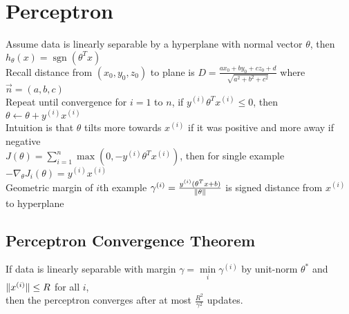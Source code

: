 \documentclass{article}
\DeclareMathOperator{\sgn}{sgn}
\DeclarePairedDelimiter\norm{\lVert}{\rVert}
\begin{document}
\newpage
\section{Perceptron}
Assume data is linearly separable by a hyperplane with normal vector $\theta$, then $h_\theta(x) = \sgn(\theta^Tx)$ \\
Recall distance from $(x_0, y_0, z_0)$ to plane is $D = \frac{ax_0 + by_0 + cz_0 + d}{\sqrt{a^2 + b^2 + c^2}}$ where $\vec n = (a, b, c)$ \\
Repeat until convergence for $i=1$ to $n$, if $y^{(i)}\theta^T x^{(i)} \leq 0$, then $\theta \leftarrow \theta + y^{(i)}x^{(i)}$ \\
Intuition is that $\theta$ tilts more towards $x^{(i)}$ if it was positive and more away if negative \\
$J(\theta) = \sum\limits_{i=1}^n \max(0, -y^{(i)} \theta^T x^{(i)})$, then for single example $-\nabla_\theta J_i(\theta) = y^{(i)}x^{(i)}$ \\
Geometric margin of $i$th example $\gamma^{(i)} = \frac{y^{(i)}(\theta^Tx + b)}{\norm \theta}$ is signed distance from $x^{(i)}$ to hyperplane
\subsection{Perceptron Convergence Theorem}
If data is linearly separable with margin $\gamma = \min\limits_i \gamma^{(i)}$ by unit-norm $\theta^*$ and $\norm {x^{(i)}} \leq R$ for all $i$, \\ then the perceptron converges after at most $\frac{R^2}{\gamma^2}$ updates.
\end{document}
